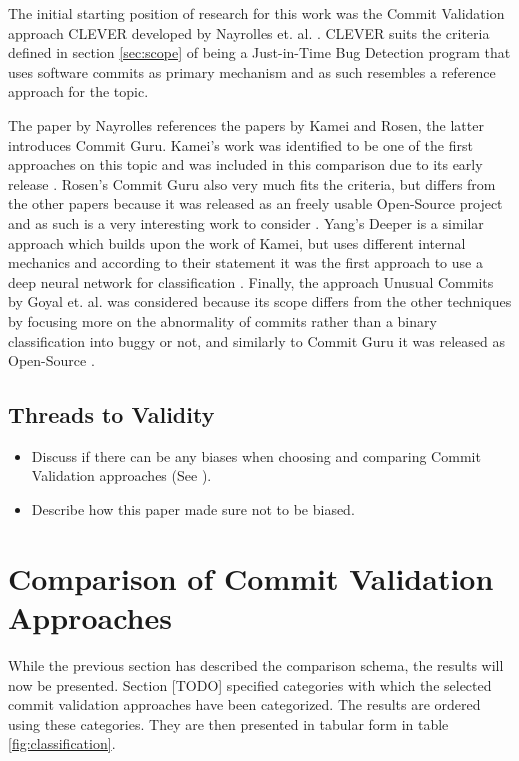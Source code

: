 The initial starting position of research for this work was the Commit Validation approach CLEVER developed by Nayrolles et. al. \cite{Nayrolles2018}. CLEVER suits the criteria defined in section \ref{sec:scope} of being a Just-in-Time Bug Detection program that uses software commits as primary mechanism and as such resembles a reference approach for the topic. 

The paper by Nayrolles references the papers by Kamei and Rosen, the latter introduces Commit Guru. Kamei's work was identified to be one of the first approaches on this topic and was included in this comparison due to its early release \cite{Kamei2013}. Rosen's Commit Guru also very much fits the criteria, but differs from the other papers because it was released as an freely usable Open-Source project and as such is a very interesting work to consider \cite{Rosen2015}. Yang's Deeper is a similar approach which builds upon the work of Kamei, but uses different internal mechanics and according to their statement it was the first approach to use a deep neural network for classification \cite{Yang2015}. Finally, the approach Unusual Commits by Goyal et. al. was considered because its scope differs from the other techniques by focusing more on the abnormality of commits rather than a binary classification into buggy or not, and similarly to Commit Guru it was released as Open-Source \cite{Goyal2017}.

\subsection{Threads to Validity}
\begin{itemize}
	\item Discuss if there can be any biases when choosing and comparing Commit Validation approaches (See \cite{Kitchenham2004}).
	\item Describe how this paper made sure not to be biased.
\end{itemize}


\section{Comparison of Commit Validation Approaches}
\label{sec:comparison}

While the previous section has described the comparison schema, the results will now be presented. Section [TODO] specified categories with which the selected commit validation approaches have been categorized. The results are ordered using these categories. They are then presented in tabular form in table \ref{fig:classification}.

